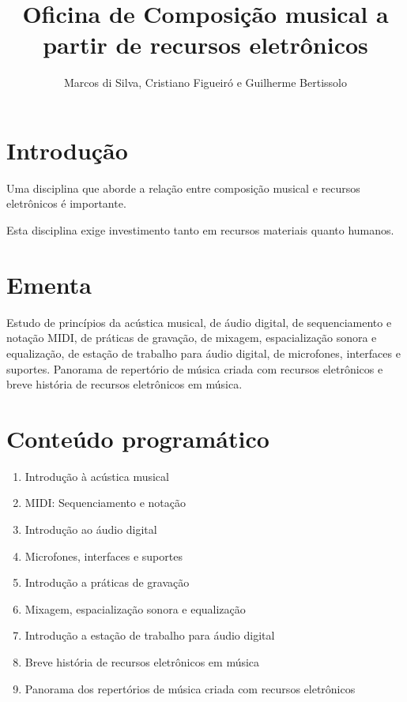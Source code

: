 \documentclass[12pt]{article}
\begin{document}
\title{Oficina de Composição musical a partir de recursos eletrônicos}
\author{Marcos di Silva, Cristiano Figueiró e Guilherme Bertissolo}
\maketitle

\thispagestyle{empty}

\section{Introdução}

Uma disciplina que aborde a relação entre composição musical e
recursos eletrônicos é importante.

Esta disciplina exige investimento tanto em recursos materiais quanto
humanos.

\section{Ementa}

Estudo de princípios da acústica musical, de áudio digital, de
sequenciamento e notação MIDI, de práticas de gravação, de mixagem,
espacialização sonora e equalização, de estação de trabalho para áudio
digital, de microfones, interfaces e suportes. Panorama de repertório
de música criada com recursos eletrônicos e breve história de recursos
eletrônicos em música.

\section{Conteúdo programático}

\begin{enumerate}
\item Introdução à acústica musical
\item MIDI: Sequenciamento e notação
\item Introdução ao áudio digital
\item Microfones, interfaces e suportes
\item Introdução a práticas de gravação
\item Mixagem, espacialização sonora e equalização
\item Introdução a estação de trabalho para áudio digital
\item Breve história de recursos eletrônicos em música
\item Panorama dos repertórios de música criada com recursos eletrônicos
\end{enumerate}
\end{document}
